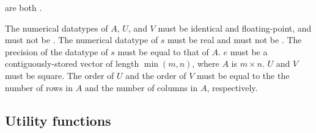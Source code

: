 \begin{flaspec}
{are both \flasvdvectorsallns.
}
\begin{checks}
\checkitem
The numerical datatypes of $ A $, $ U $, and $ V $ must be identical and
floating-point, and must not be \flaconstantns.
\itemvsp
\checkitem
The numerical datatype of $ s $ must be real and must not be
\flaconstantns.
\itemvsp
\checkitem
The precision of the datatype of $ s $ must be equal to that of $ A $.
\itemvsp
\checkitem
$ e $ must be a contiguously-stored vector of length $ \min(m,n) $,
where $ A $ is $ m \times n $.
\itemvsp
\checkitem
$ U $ and $ V $ must be square.
\itemvsp
\checkitem
The order of $ U $ and the order of $ V $ must be equal to the the number of
rows in $ A $ and the number of columns in $ A $, respectively.
\end{checks}
\begin{params}
\end{params}
\end{flaspec}










\subsection{Utility functions}





